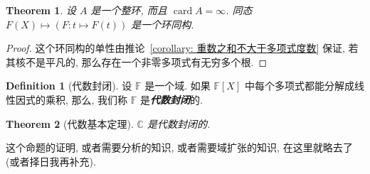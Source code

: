 \documentclass[openany]{ctexbook}
\newcommand*{\indexbf}[1]{\emph{\textbf{#1}}\index{#1}} %
\theoremstyle{plain}
\newtheorem{theorem}{Theorem}[section] %
\theoremstyle{definition}
\newtheorem{definition}{Definition}[section] %
\DeclareMathOperator{\card}{card}
\begin{document}
\begin{theorem}
	设 $A$ 是一个整环, 而且 $\card A = \infty$. 
	同态 $F(X) \mapsto (F \colon t \mapsto F(t))$ 是一个环同构.
\end{theorem}
\begin{proof}
	这个环同构的单性由推论~\ref{corollary: 重数之和不大于多项式度数} 保证, 若其核不是平凡的, 那么存在一个非零多项式有无穷多个根.
\end{proof}

\begin{definition}[代数封闭]
	设 $\mathbb F$ 是一个域. 如果 $\mathbb F[X]$ 中每个多项式都能分解成线性因式的乘积, 那么, 我们称 $\mathbb F$ 是\indexbf{代数封闭}的.
\end{definition}

\begin{theorem}[代数基本定理]\label{theorem: 代数基本定理}
	$\mathbb C$ 是代数封闭的.
\end{theorem}

这个命题的证明, 或者需要分析的知识, 或者需要域扩张的知识, 在这里就略去了 (或者择日我再补充).



\backmatter
\nocite{*} %
\printbibliography[heading=bibliography, title={参考文献}]

\printindex[symbol]


\printindex
\end{document}
